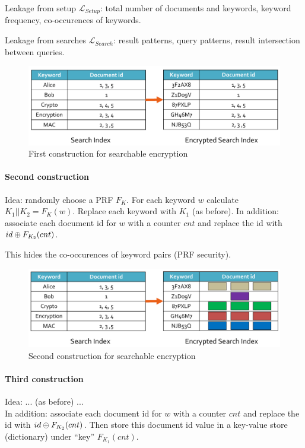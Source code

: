 Leakage from setup $\mathcal{L}_{Setup}$:
total number of documents and keywords, keyword frequency, co-occurences of keywords.

Leakage from searches $\mathcal{L}_{Search}$:
result patterns, query patterns, result intersection between queries.

\begin{figure}[h]
    \centering
	\includegraphics[scale=0.4]{images/searchable-encryption-1.png}
    \caption{First construction for searchable encryption}
    \label{fig:searchable-encryption-1}
\end{figure}

\paragraph{Second construction}
Idea: randomly choose a PRF $F_K$.
For each keyword $w$ calculate $K_1 || K_2 = F_K(w)$.
Replace each keyword with $K_1$ (as before).
In addition: associate each document id for $w$ with a counter $cnt$ and replace the id with $id \oplus F_{K_2}(cnt)$.

This hides the co-occurences of keyword pairs (PRF security).

\begin{figure}[h]
    \centering
	\includegraphics[scale=0.35]{images/searchable-encryption-2.png}
    \caption{Second construction for searchable encryption}
    \label{fig:searchable-encryption-2}
\end{figure}

\paragraph{Third construction}
Idea: ... (as before) ... \\
In addition: associate each document id for $w$ with a counter $cnt$ and replace the id with $id \oplus F_{K_2}(cnt)$.
Then store this document id value in a key-value store (dictionary) under ``key'' $F_{K_1}(cnt)$.

